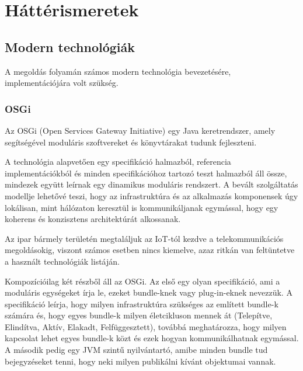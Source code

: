 
\chapter{Háttérismeretek}
\section{Modern technológiák}

A megoldás folyamán számos modern technológia bevezetésére, implementációjára volt szükség.

\subsection{OSGi}

Az OSGi (Open Services Gateway Initiative) \cite{alliance} egy Java keretrendszer, amely segítségével moduláris szoftvereket és könyvtárakat tudunk fejleszteni.

A technológia alapvetően egy specifikáció halmazból, referencia implementációkból és minden specifikációhoz tartozó teszt halmazból áll össze, mindezek együtt leírnak egy dinamikus moduláris rendszert. A bevált szolgáltatás modellje lehetővé teszi, hogy az infrastruktúra és az alkalmazás komponensek úgy lokálisan, mint hálózaton keresztül is kommunikáljanak egymással, hogy egy koherens és konzisztens architektúrát alkossanak.

Az ipar bármely területén megtaláljuk az IoT-tól kezdve a telekommunikációs megoldásokig, viszont számos esetben nincs kiemelve, azaz ritkán van feltüntetve a használt technológiák listáján. 

Kompozícióilag két részből áll az OSGi. Az első egy olyan specifikáció, ami a moduláris egységeket írja le, ezeket bundle-knek vagy plug-in-eknek nevezzük. A specifikáció leírja, hogy milyen infrastruktúra szükséges az említett bundle-k számára és, hogy egyes bundle-k milyen életcikluson mennek át (Telepítve, Elindítva, Aktív, Elakadt, Felfüggesztett), továbbá meghatározza, hogy milyen kapcsolat lehet egyes bundle-k közt és ezek hogyan kommunikálhatnak egymással. A második pedig egy JVM szintű nyilvántartó, amibe minden bundle tud bejegyzéseket tenni, hogy neki milyen publikálni kívánt objektumai vannak.


